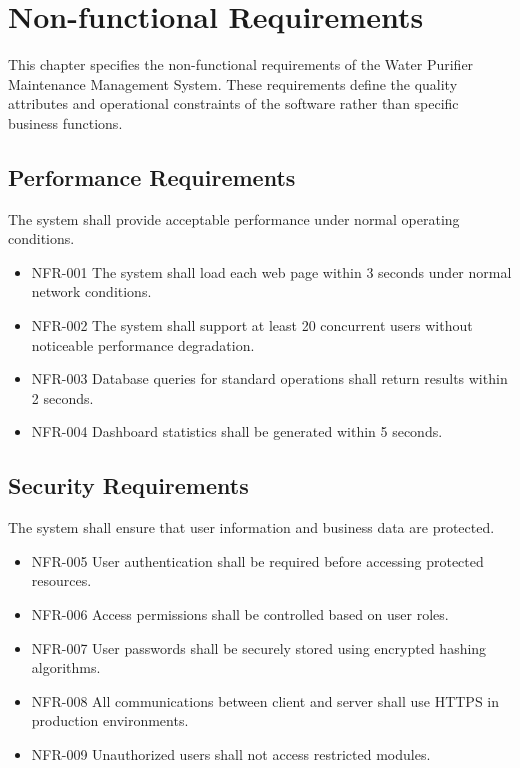 \chapter{Non-functional Requirements}

This chapter specifies the non-functional requirements of the Water Purifier Maintenance Management System. These requirements define the quality attributes and operational constraints of the software rather than specific business functions.

\section{Performance Requirements}

The system shall provide acceptable performance under normal operating conditions.

\begin{itemize}
    \item NFR-001 The system shall load each web page within 3 seconds under normal network conditions.
    \item NFR-002 The system shall support at least 20 concurrent users without noticeable performance degradation.
    \item NFR-003 Database queries for standard operations shall return results within 2 seconds.
    \item NFR-004 Dashboard statistics shall be generated within 5 seconds.
\end{itemize}

\section{Security Requirements}

The system shall ensure that user information and business data are protected.

\begin{itemize}
    \item NFR-005 User authentication shall be required before accessing protected resources.
    \item NFR-006 Access permissions shall be controlled based on user roles.
    \item NFR-007 User passwords shall be securely stored using encrypted hashing algorithms.
    \item NFR-008 All communications between client and server shall use HTTPS in production environments.
    \item NFR-009 Unauthorized users shall not access restricted modules.
\end{itemize}

